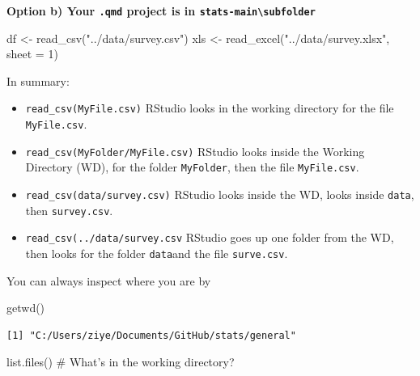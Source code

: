 \documentclass[
  letterpaper,
  DIV=11,
  numbers=noendperiod]{scrreprt}
\newenvironment{Shaded}{\begin{snugshade}}{\end{snugshade}}
\newcommand{\AttributeTok}[1]{\textcolor[rgb]{0.40,0.45,0.13}{#1}}
\newcommand{\CommentTok}[1]{\textcolor[rgb]{0.37,0.37,0.37}{#1}}
\newcommand{\DecValTok}[1]{\textcolor[rgb]{0.68,0.00,0.00}{#1}}
\newcommand{\FunctionTok}[1]{\textcolor[rgb]{0.28,0.35,0.67}{#1}}
\newcommand{\NormalTok}[1]{\textcolor[rgb]{0.00,0.23,0.31}{#1}}
\newcommand{\OtherTok}[1]{\textcolor[rgb]{0.00,0.23,0.31}{#1}}
\newcommand{\StringTok}[1]{\textcolor[rgb]{0.13,0.47,0.30}{#1}}
\begin{document}
\textbf{Option b) Your \texttt{.qmd} project is in
\texttt{stats-main\textbackslash{}subfolder}}

\begin{Shaded}
\begin{Highlighting}[]
\NormalTok{df }\OtherTok{\textless{}{-}} \FunctionTok{read\_csv}\NormalTok{(}\StringTok{"../data/survey.csv"}\NormalTok{)}
\NormalTok{xls }\OtherTok{\textless{}{-}} \FunctionTok{read\_excel}\NormalTok{(}\StringTok{"../data/survey.xlsx"}\NormalTok{, }\AttributeTok{sheet =} \DecValTok{1}\NormalTok{)}
\end{Highlighting}
\end{Shaded}

In summary:

\begin{itemize}
\item
  \texttt{read\_csv(MyFile.csv)} RStudio looks in the working directory
  for the file \texttt{MyFile.csv}.
\item
  \texttt{read\_csv(MyFolder/MyFile.csv)} RStudio looks inside the
  Working Directory (WD), for the folder \texttt{MyFolder}, then the
  file \texttt{MyFile.csv}.
\item
  \texttt{read\_csv(data/survey.csv)} RStudio looks inside the WD, looks
  inside \texttt{data}, then \texttt{survey.csv}.
\item
  \texttt{read\_csv(\textasciigrave{}\textasciigrave{}../data/survey.csv}
  RStudio goes up one folder from the WD, then looks for the folder
  \texttt{data}and the file \texttt{surve.csv}.
\end{itemize}

You can always inspect where you are by

\begin{Shaded}
\begin{Highlighting}[]
\FunctionTok{getwd}\NormalTok{()}
\end{Highlighting}
\end{Shaded}

\begin{verbatim}
[1] "C:/Users/ziye/Documents/GitHub/stats/general"
\end{verbatim}

\begin{Shaded}
\begin{Highlighting}[]
\FunctionTok{list.files}\NormalTok{()        }\CommentTok{\# What’s in the working directory?}
\end{Highlighting}
\end{Shaded}
\end{document}
